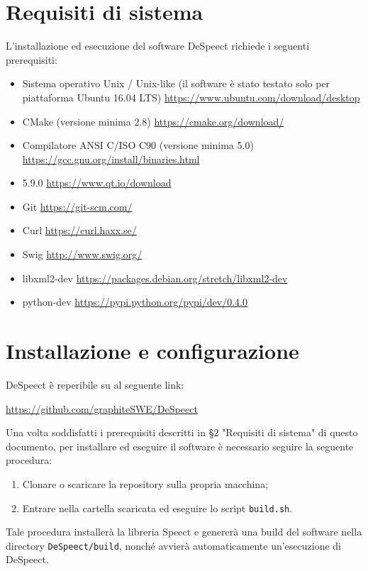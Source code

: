 \documentclass[openany,12pt,a4paper]{report}
\begin{document}
	\chapter{Requisiti di sistema}
	
	L'installazione ed esecuzione del software DeSpeect richiede i seguenti prerequisiti:
	
	\begin{itemize}
		\item Sistema operativo Unix / Unix-like (il software è stato testato solo per piattaforma Ubuntu 16.04 LTS)
		\subitem \url{https://www.ubuntu.com/download/desktop}
		\item CMake (versione minima 2.8)
		\subitem \url{https://cmake.org/download/}
		\item Compilatore ANSI C/ISO C90  (versione minima 5.0)
		\subitem \url{https://gcc.gnu.org/install/binaries.html}
		\item {} 5.9.0
		\subitem \url{https://www.qt.io/download}
		\item Git
		\subitem \url{https://git-scm.com/} 
		\item Curl 
		\subitem \url{https://curl.haxx.se/}
		\item Swig 
		\subitem \url{http://www.swig.org/}
		\item libxml2-dev
		\subitem \url{https://packages.debian.org/stretch/libxml2-dev} 
		\item python-dev
		\subitem \url{https://pypi.python.org/pypi/dev/0.4.0}
	\end{itemize}	
	 
	\chapter{Installazione e configurazione} 
	
	DeSpeect è reperibile su  al seguente link:
	\begin{center}
		\url{https://github.com/graphiteSWE/DeSpeect}
	\end{center}
	
	\noindent Una volta soddisfatti i prerequisiti descritti in §2 "Requisiti di sistema" di questo documento, per installare ed eseguire il software è necessario seguire la seguente procedura:
	\begin{enumerate}
		\item Clonare o scaricare la repository sulla propria macchina;
		\item Entrare nella cartella scaricata ed eseguire lo script \verb|build.sh|.
	\end{enumerate}
	Tale procedura installerà la libreria Speect e genererà una build del software nella directory \verb|DeSpeect/build|, nonché avvierà automaticamente un'esecuzione di DeSpeect.
	
\end{document}
